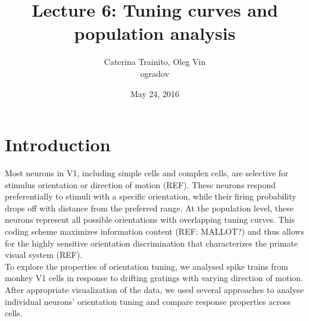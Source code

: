 \documentclass[10pt]{article}
\title{Lecture 6: Tuning curves and population analysis}
\author{Caterina Trainito, Oleg Vin\\
ogradov}
\date{May 24, 2016}
\begin{document}
\maketitle

\section*{Introduction}

Most neurons in V1, including simple cells and complex cells, are selective for stimulus orientation or direction of motion (REF). These neurons respond preferentially to stimuli with a specific orientation, while their firing probability drops off with distance from the preferred range. At the population level, these neurons represent all possible orientations with overlapping tuning curves. This coding scheme maximizes information content (REF: MALLOT?) and thus allows for the highly sensitive orientation discrimination that characterizes the primate visual system (REF). \\

To explore the properties of orientation tuning, we analysed spike trains from monkey V1 cells in response to drifting gratings with varying direction of motion. After appropriate visualization of the data, we used several approaches to analyse individual neurons' orientation tuning and compare response properties across cells.
\end{document}
